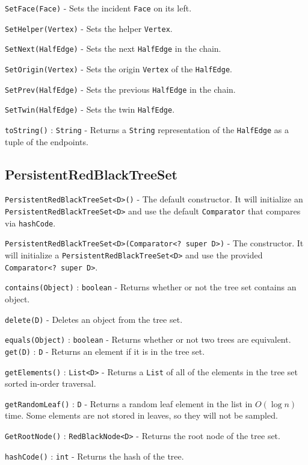 \documentclass[11pt]{article}
\begin{document}
	\texttt{SetFace(Face)} - Sets the incident \texttt{Face} on its left.
	
	\texttt{SetHelper(Vertex)} - Sets the helper \texttt{Vertex}.
	
	\texttt{SetNext(HalfEdge)} - Sets the next \texttt{HalfEdge} in the chain.
	
	\texttt{SetOrigin(Vertex)} - Sets the origin \texttt{Vertex} of the \texttt{HalfEdge}.
	
	\texttt{SetPrev(HalfEdge)} - Sets the previous \texttt{HalfEdge} in the chain.
	
	\texttt{SetTwin(HalfEdge)} - Sets the twin \texttt{HalfEdge}.
	
	\texttt{toString()} : \texttt{String} - Returns a \texttt{String} representation of the \texttt{HalfEdge} as a tuple of the endpoints.

\subsection{PersistentRedBlackTreeSet}
\label{sec:prbtree}

\texttt{PersistentRedBlackTreeSet<D>()} - The default constructor. It will initialize an \texttt{PersistentRedBlackTreeSet<D>} and use the default \texttt{Comparator} that compares via \texttt{hashCode}.

\texttt{PersistentRedBlackTreeSet<D>(Comparator<? super D>)} - The constructor. It will initialize a \texttt{PersistentRedBlackTreeSet<D>} and use the provided \texttt{Comparator<? super D>}.

\texttt{contains(Object)} : \texttt{boolean} - Returns whether or not the tree set contains an object.

\texttt{delete(D)} - Deletes an object from the tree set.

\texttt{equals(Object)} : \texttt{boolean} - Returns whether or not two trees are equivalent.
\texttt{get(D)} : \texttt{D} - Returns an element if it is in the tree set.

\texttt{getElements()} : \texttt{List<D>} - Returns a \texttt{List} of all of the elements in the tree set sorted in-order traversal.

\texttt{getRandomLeaf()} : \texttt{D} - Returns a random leaf element in the list in $O\left( \log n \right)$ time. Some elements are not stored in leaves, so they will not be sampled.

\texttt{GetRootNode()} : \texttt{RedBlackNode<D>} - Returns the root node of the tree set.

\texttt{hashCode()} : \texttt{int} - Returns the hash of the tree.
\end{document}
